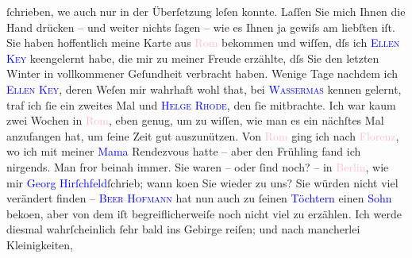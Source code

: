                     ſchrieben, we{\geminationn} auch nur in der Überſetzung leſen
                    konnte. Laſſen Sie mich Ihnen die Hand drücken – und {\pb}weiter nichts ſagen – wie es Ihnen ja gewiſs
                    am liebſten iſt.\pend
           \pstart
           Sie haben hoffentlich meine Karte aus \textcolor{pink}{Rom}{}\ledrightnote{\textcolor{pink}{Rom}}
                    bekommen und wiſſen, dſs ich \textcolor{blue}{\textsc{Ellen Key}}{}\ledrightnote{\textcolor{blue}{Ellen Key}} ke{\geminationn}engelernt habe, die mir zu meiner Freude
                    erzählte, dſs Sie den letzten Winter in vollkommener Geſundheit verbracht haben.
                    Wenige Tage nachdem ich \textcolor{blue}{\textsc{Ellen Key}}{}\ledrightnote{\textcolor{blue}{Ellen Key}}, deren Weſen mir wahrhaft wohl that, bei \textcolor{blue}{\textsc{Wasserma{\geminationn}s}}{}\ledrightnote{\textcolor{blue}{Jakob Wassermann}{\newline}\textcolor{blue}{Julie Wassermann}} kennen gelernt, traf ich ſie ein zweites Mal und {\pb}\textcolor{blue}{\textsc{Helge Rhode}}{}\ledrightnote{\textcolor{blue}{Helge Rode}}, den ſie mitbrachte. Ich war kaum zwei Wochen in \textcolor{pink}{Rom}{}\ledrightnote{\textcolor{pink}{Rom}}, eben genug, um zu wiſſen, wie man es ein nächſtes Mal
                    anzufangen hat, um ſeine Zeit gut auszunützen. Von \textcolor{pink}{Rom}{}\ledrightnote{\textcolor{pink}{Rom}} ging ich nach \textcolor{pink}{Florenz}{}\ledrightnote{\textcolor{pink}{Florenz}}, wo ich mit
                    meiner \textcolor{blue}{Mama}{} Rendezvous
                    hatte – aber den Frühling fand ich nirgends. Man fror beinah immer.\pend
           \pstart
           Sie waren – oder ſind noch? – in \textcolor{pink}{Berlin}{}\ledrightnote{\textcolor{pink}{Berlin}}, wie mir
                        \textcolor{blue}{Georg Hirſchfeld}{}\ledrightnote{\textcolor{blue}{Georg Hirschfeld}}{ }{\pb}ſchrieb; wann ko{\geminationm}en Sie wieder zu uns? Sie würden nicht viel verändert finden – \textcolor{blue}{\textsc{Beer Hofmann}}{}\ledrightnote{\textcolor{blue}{Richard Beer-Hofmann}} hat nun auch zu ſeinen \textcolor{blue}{Töchtern}{} einen \textcolor{blue}{Sohn}{} beko{\geminationm}en, aber von
                    dem iſt begreiflicherweiſe noch nicht viel zu erzählen. Ich werde diesmal
                    wahrſcheinlich ſehr bald ins Gebirge reiſen; und nach mancherlei Kleinigkeiten,
